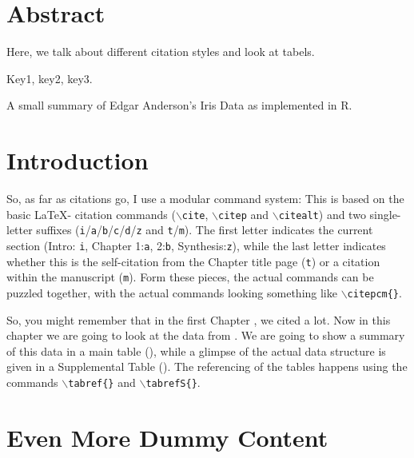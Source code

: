 \section*{Abstract}
\noindent
Here, we talk about different citation styles and look at tabels.

 Key1, key2, key3.

\begin{multicols}{2}

\begin{table*}[!htb]
\centering
\caption[Summary of Anderson's Iris Data]{\label{tab:c2t1}
A small summary of Edgar Anderson's Iris Data as implemented in R.}
\begin{small}

\end{small}
\end{table*}

\section{Introduction}

So, as far as citations go, I use a modular command system: This is based on the basic \LaTeX - citation commands (\texttt{$\backslash$cite}, \texttt{$\backslash$citep} and \texttt{$\backslash$citealt}) and two single-letter suffixes (\texttt{i}/\texttt{a}/\texttt{b}/\texttt{c}/\texttt{d}/\texttt{z} and \texttt{t}/\texttt{m}). The first letter indicates the current section (Intro: \texttt{i}, Chapter 1:\texttt{a}, 2:\texttt{b}, Synthesis:\texttt{z}), while the last letter indicates whether this is the self-citation from the Chapter title page (\texttt{t}) or a citation within the manuscript (\texttt{m}).
Form these pieces, the actual commands can be puzzled together, with the actual commands looking something like \texttt{$\backslash$citepcm\{\}}.

So, you might remember that in the first Chapter , we cited  a lot.
Now in this chapter we are going to look at the data from .
We are going to show a summary of this data in a main table (), while a glimpse of the actual data structure is given in a Supplemental Table ().
The referencing of the tables happens using the commands \texttt{$\backslash$tabref\{\}} and \texttt{$\backslash$tabrefS\{\}}.

\section{Even More Dummy Content}
\textcolor{black!35}{\lipsum[7-8]}


\end{multicols}
